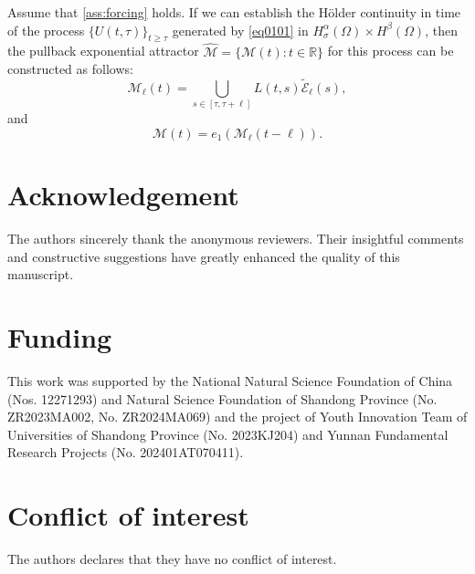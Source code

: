 \documentclass[oneside,preprint,12pt,numbers,sort&compress]{elsarticle}
\begin{document}
\begin{remark}
Assume that \cref{ass:forcing} holds. If we can establish the Hölder continuity in time of the process \(\{U(t, \tau)\}_{t \geq \tau}\) generated by \cref{eq0101} in $H_\sigma^{\alpha}(\Omega) \times H^{\beta}(\Omega)$, then the pullback exponential attractor \(\hat{\mathcal{M}} = \{\mathcal{M}(t) : t \in \mathbb{R}\}\) for this process can be constructed as follows:
\[
\mathcal{M}_{\ell}(t) = \bigcup_{s \in [\tau, \tau+\ell]} L(t, s) \tilde{\mathcal{E}}_{\ell}(s),
\]
and
\[
\mathcal{M}(t) = e_1\left( \mathcal{M}_{\ell}(t-\ell) \right).
\]
\end{remark}


\section{Acknowledgement}
The authors sincerely thank the anonymous reviewers. Their insightful comments and constructive suggestions have greatly enhanced the quality of this manuscript.

\section*{Funding}
This work was supported by the National Natural Science Foundation of China (Nos. 12271293) and Natural Science Foundation of Shandong Province (No. ZR2023MA002, No. ZR2024MA069) and the project of Youth Innovation Team of Universities of Shandong Province (No. 2023KJ204) and Yunnan Fundamental Research Projects (No. 202401AT070411).

\section*{Conflict of interest}
The authors declares that they have no conflict of interest.
\end{document}
